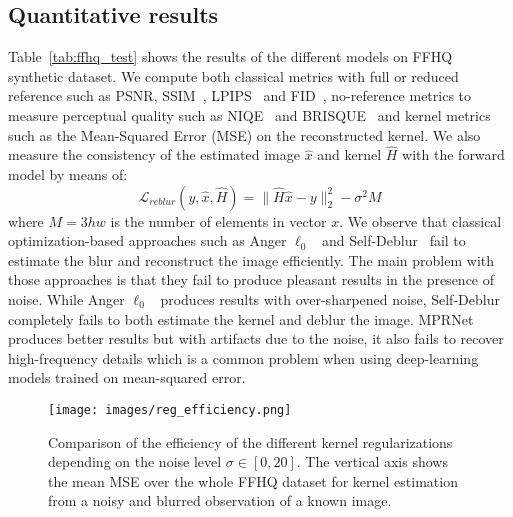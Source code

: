 \documentclass[10pt,twocolumn,letterpaper]{article}
\begin{document}
\subsection{Quantitative results}
%
%
Table~\ref{tab:ffhq_test} shows the results of the different models on FFHQ synthetic dataset.
We compute both classical metrics with full or reduced reference such as PSNR, SSIM~\cite{ssim}, LPIPS~\cite{lpips} and FID~\cite{NIPS2017_8a1d6947}, no-reference metrics to measure perceptual quality such as NIQE~\cite{niqe} and BRISQUE~\cite{brisque} and kernel metrics such as the Mean-Squared Error (MSE) on the reconstructed kernel. We also measure the consistency of the estimated image $\widehat{x}$ and kernel $\widehat{H}$ with the forward model by means of:
\begin{equation}
    \mathcal{L}_{reblur}(y, \widehat{x}, \widehat{H})= \|\widehat{H}\widehat{x} - y\|_2^2 - \sigma^2 M
\end{equation}
where $M=3hw$ is the number of elements in vector $x$.
We observe that classical optimization-based approaches such as Anger $\ell_0$~\cite{anger_blind_2019} and Self-Deblur~\cite{ren_neural_2020} fail to estimate the blur and reconstruct the image efficiently. The main problem with those approaches is that they fail to produce pleasant results in the presence of noise. While Anger $\ell_0$~\cite{anger_blind_2019} produces results with over-sharpened noise, Self-Deblur~\cite{ren_neural_2020} completely fails to both estimate the kernel and deblur the image.
%
%
MPRNet produces better results but with artifacts due to the noise, it also fails to recover high-frequency details which is a common problem when using deep-learning models trained on mean-squared error.
%
%
\begin{figure}[b]
    \centering
    \texttt{[image: images/reg\_efficiency.png]}
    \caption{Comparison of the efficiency of the different kernel regularizations depending on the noise level $\sigma\in[0,20]$.
    The vertical axis shows the mean MSE over the whole FFHQ dataset for kernel estimation from a noisy and blurred observation of a known image.}
    \label{fig:reg_compar}
    \vspace{-5pt}
\end{figure}
\end{document}

